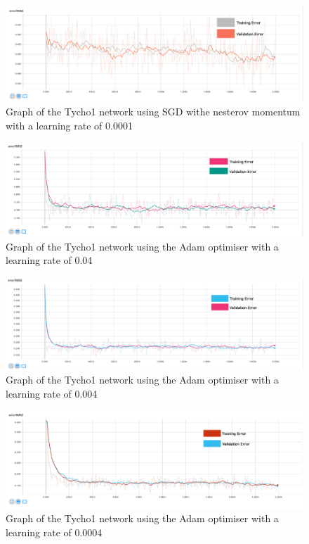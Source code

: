 \documentclass[12pt,a4paper,oneside,oldfontcommands]{memoir}
\begin{document}
\begin{Declaration Of OriginalityOrginality}
\begin{figure}[H]
  \centering
    \includegraphics[width=\linewidth]{graphs/A/tycho_1_NESTEROV_0001_sigmoid.png}
    \caption{Graph of the Tycho1 network using SGD withe nesterov momentum with a learning rate of 0.0001}
\end{figure}

\begin{figure}[H]
  \centering
    \includegraphics[width=\linewidth]{graphs/A/tycho_1_ADAM_04_sigmoid.png}
    \caption{Graph of the Tycho1 network using the Adam optimiser with a learning rate of 0.04}
\end{figure}

\begin{figure}[H]
  \centering
    \includegraphics[width=\linewidth]{graphs/A/tycho_1_ADAM_004_sigmoid.png}
    \caption{Graph of the Tycho1 network using the Adam optimiser with a learning rate of 0.004}
\end{figure}

\begin{figure}[H]
  \centering
    \includegraphics[width=\linewidth]{graphs/A/tycho_1_ADAM_0004_sigmoid.png}
    \caption{Graph of the Tycho1 network using the Adam optimiser with a learning rate of 0.0004}
\end{figure}


\end{Declaration Of OriginalityOrginality}
\end{document}
